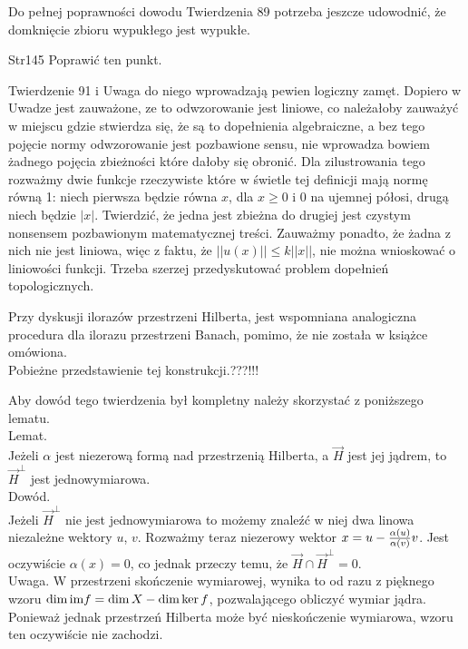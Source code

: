 \documentclass[a4paper,11pt]{article}
\begin{document}
\vspace{\spaceFour}


\start {} Do pełnej poprawności dowodu Twierdzenia 89 potrzeba
jeszcze udowodnić, że domknięcie zbioru wypukłego jest wypukłe.

\vspace{\spaceFour}


\start Str{145} Poprawić ten punkt.

\vspace{\spaceFour}


\start {} Twierdzenie 91 i Uwaga do niego wprowadzają pewien
logiczny zamęt. Dopiero w Uwadze jest zauważone, ze to odwzorowanie
jest liniowe, co należałoby zauważyć w miejscu gdzie stwierdza się, że
są to dopełnienia algebraiczne, a bez tego pojęcie normy odwzorowanie
jest pozbawione sensu, nie wprowadza bowiem żadnego pojęcia zbieżności
które dałoby się obronić. Dla zilustrowania tego rozważmy dwie funkcje
rzeczywiste które w świetle tej definicji mają normę równą 1: niech
pierwsza będzie równa $x$, dla $x \geq 0$ i 0 na ujemnej półosi, drugą
niech będzie $| x |$. Twierdzić, że jedna jest zbieżna do drugiej jest
czystym nonsensem pozbawionym matematycznej treści. Zauważmy ponadto,
że żadna z nich nie jest liniowa, więc z faktu, że
$|| u( x ) || \leq k || x ||$, nie można wnioskować o liniowości
funkcji. Trzeba szerzej przedyskutować problem dopełnień
topologicznych.

\vspace{\spaceFour}


\start {} Przy dyskusji ilorazów przestrzeni Hilberta, jest
wspomniana analogiczna procedura dla ilorazu przestrzeni Banach,
pomimo, że nie została w książce omówiona. \\
Pobieżne przedstawienie tej konstrukcji.???!!!

\vspace{\spaceFour}


\start {} Aby dowód tego twierdzenia był kompletny należy
skorzystać z poniższego lematu. \\
Lemat. \\
Jeżeli $\alpha$ jest niezerową formą nad przestrzenią Hilberta, a
$\vec{ H }$
jest jej jądrem, to $\vec{ H }^{ \bot }$ jest jednowymiarowa. \\
Dowód. \\
Jeżeli $\vec{ H }^{ \bot }$ nie jest jednowymiarowa to możemy znaleźć w
niej dwa linowa niezależne wektory $u$, $v$. Rozważmy teraz niezerowy
wektor $x = u -\frac{ \alpha( u ) }{ \alpha( v ) }v$. Jest oczywiście
$\alpha( x ) = 0$,
co jednak przeczy temu, że $\vec{ H } \cap \vec{ H }^{ \bot } =  0$. \\
Uwaga. W przestrzeni skończenie wymiarowej, wynika to od razu z
pięknego wzoru $\dim\textrm{im} f = \dim X - \dim\ker f$, pozwalającego
obliczyć wymiar jądra. Ponieważ jednak przestrzeń Hilberta może być
nieskończenie wymiarowa, wzoru ten oczywiście nie zachodzi.
\end{document}
